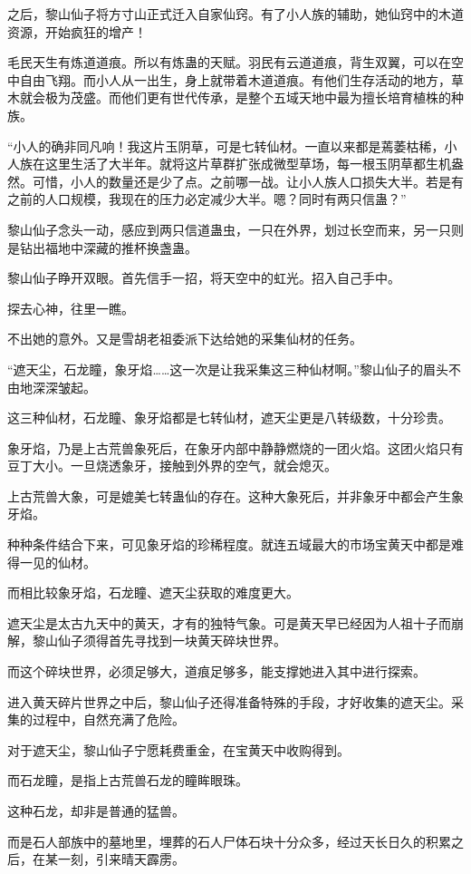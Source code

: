 \begin{this_body}
之后，黎山仙子将方寸山正式迁入自家仙窍。有了小人族的辅助，她仙窍中的木道资源，开始疯狂的增产！

毛民天生有炼道道痕。所以有炼蛊的天赋。羽民有云道道痕，背生双翼，可以在空中自由飞翔。而小人从一出生，身上就带着木道道痕。有他们生存活动的地方，草木就会极为茂盛。而他们更有世代传承，是整个五域天地中最为擅长培育植株的种族。

“小人的确非同凡响！我这片玉阴草，可是七转仙材。一直以来都是蔫萎枯稀，小人族在这里生活了大半年。就将这片草群扩张成微型草场，每一根玉阴草都生机盎然。可惜，小人的数量还是少了点。之前哪一战。让小人族人口损失大半。若是有之前的人口规模，我现在的压力必定减少大半。嗯？同时有两只信蛊？”

黎山仙子念头一动，感应到两只信道蛊虫，一只在外界，划过长空而来，另一只则是钻出福地中深藏的推杯换盏蛊。

黎山仙子睁开双眼。首先信手一招，将天空中的虹光。招入自己手中。

探去心神，往里一瞧。

不出她的意外。又是雪胡老祖委派下达给她的采集仙材的任务。

“遮天尘，石龙瞳，象牙焰……这一次是让我采集这三种仙材啊。”黎山仙子的眉头不由地深深皱起。

这三种仙材，石龙瞳、象牙焰都是七转仙材，遮天尘更是八转级数，十分珍贵。

象牙焰，乃是上古荒兽象死后，在象牙内部中静静燃烧的一团火焰。这团火焰只有豆丁大小。一旦烧透象牙，接触到外界的空气，就会熄灭。

上古荒兽大象，可是媲美七转蛊仙的存在。这种大象死后，并非象牙中都会产生象牙焰。

种种条件结合下来，可见象牙焰的珍稀程度。就连五域最大的市场宝黄天中都是难得一见的仙材。

而相比较象牙焰，石龙瞳、遮天尘获取的难度更大。

遮天尘是太古九天中的黄天，才有的独特气象。可是黄天早已经因为人祖十子而崩解，黎山仙子须得首先寻找到一块黄天碎块世界。

而这个碎块世界，必须足够大，道痕足够多，能支撑她进入其中进行探索。

进入黄天碎片世界之中后，黎山仙子还得准备特殊的手段，才好收集的遮天尘。采集的过程中，自然充满了危险。

对于遮天尘，黎山仙子宁愿耗费重金，在宝黄天中收购得到。

而石龙瞳，是指上古荒兽石龙的瞳眸眼珠。

这种石龙，却非是普通的猛兽。

而是石人部族中的墓地里，埋葬的石人尸体石块十分众多，经过天长日久的积累之后，在某一刻，引来晴天霹雳。


\end{this_body}
